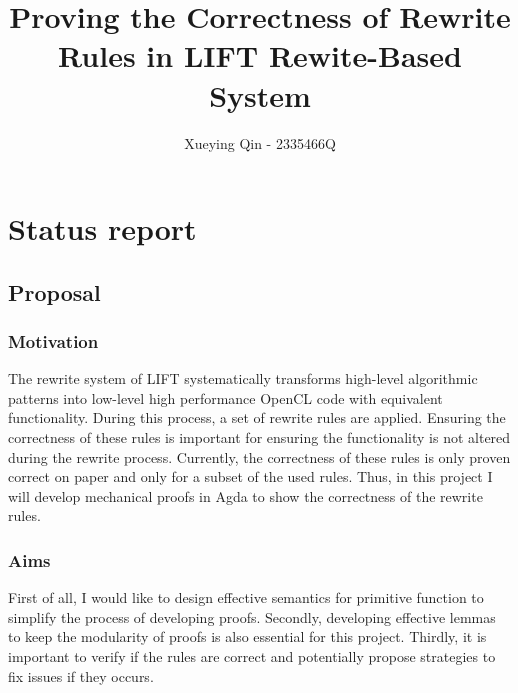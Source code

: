 \documentclass[11pt]{article}
\title{ Proving the Correctness of Rewrite Rules in LIFT Rewite-Based System }
\author{ Xueying Qin - 2335466Q }
\begin{document}
\maketitle

\section{Status report}

\subsection{Proposal}\label{proposal}

\subsubsection{Motivation}\label{motivation}
The rewrite system of LIFT systematically transforms high-level algorithmic patterns into low-level 
high performance OpenCL code with equivalent functionality. During this process, a set of rewrite 
rules are applied. Ensuring the correctness of these rules is important for ensuring the functionality 
is not altered during the rewrite process. Currently, the correctness of these rules is only proven 
correct on paper and only for a subset of the used rules. Thus, in this project I will develop 
mechanical proofs in Agda to show the correctness of the rewrite rules.

\subsubsection{Aims}\label{aims}
First of all, I would like to design effective semantics for primitive function to simplify the process of 
developing proofs. Secondly, developing effective lemmas to keep the modularity of proofs is also essential 
for this project. Thirdly, it is important to verify if the rules are correct and potentially propose 
strategies to fix issues if they occurs.
\end{document}
